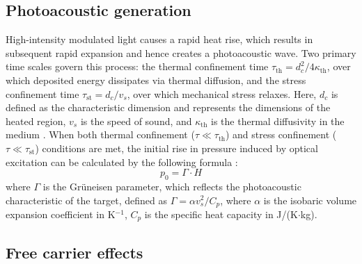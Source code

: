 \documentclass{optica-article}
\begin{document}
\subsection{Photoacoustic generation}

High-intensity modulated light causes a rapid heat rise, which results in subsequent rapid expansion and hence creates a photoacoustic wave. Two primary time scales govern this process: the thermal confinement time $\tau_{\text{th}} = d_c^2/4\kappa_{\text{th}}$, over which deposited energy dissipates via thermal diffusion, and the stress confinement time $\tau_{\text{st}} = d_c/v_s$, over which mechanical stress relaxes. Here, $d_c$ is defined as the characteristic dimension and represents the dimensions of the heated region, $v_s$ is the speed of sound, and $\kappa_{\text{th}}$ is the thermal diffusivity in the medium \cite{xu2006photoacoustic}. When both thermal confinement ($\tau \ll \tau_{\text{th}}$) and stress confinement ($\tau \ll \tau_{\text{st}}$) conditions are met, the initial rise in pressure induced by optical excitation can be calculated by the following formula \cite{wang-2007}:
\begin{equation}
p_0 = \Gamma \cdot H
\label{eq:general_pa}
\end{equation}
where $\Gamma$ is the Gr\"uneisen parameter, which reflects the photoacoustic characteristic of the target, defined as $\Gamma = \alpha v_s^2/C_p$, where $\alpha$ is the isobaric volume expansion coefficient in K$^{-1}$, $C_p$ is the specific heat capacity in J/(K$\cdot$kg).

\subsection{Free carrier effects}
\end{document}
